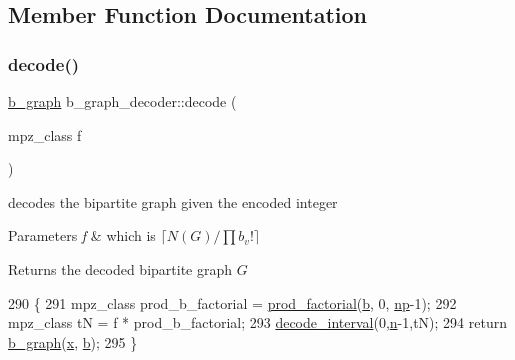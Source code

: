 \subsection{Member Function Documentation}
\mbox{\label{classb__graph__decoder_a81cffad95fa5a051fa4421b164f236a9}} 
\subsubsection{\texorpdfstring{decode()}{decode()}}
{\footnotesize\ttfamily \hyperlink{classb__graph}{b\+\_\+graph} b\+\_\+graph\+\_\+decoder\+::decode (\begin{DoxyParamCaption}\item[{mpz\+\_\+class}]{f }\end{DoxyParamCaption})}



decodes the bipartite graph given the encoded integer 


\begin{DoxyParams}{Parameters}
{\em f} & which is $\lceil N(G) / \prod b_v! \rceil$ \\
\hline
\end{DoxyParams}
\begin{DoxyReturn}{Returns}
the decoded bipartite graph $G$ 
\end{DoxyReturn}

\begin{DoxyCode}
290 \{
291   mpz\_class prod\_b\_factorial = \hyperlink{compression__helper_8cpp_a86d8a20e022dc06b23df3b08ac10b7d1}{prod\_factorial}(\hyperlink{classb__graph__decoder_a12d1a4a91f342111d2116196cb826317}{b}, 0, \hyperlink{classb__graph__decoder_a7eca48cf8793e722d1b29dbdc9fd2dca}{np}-1);
292   mpz\_class tN = f * prod\_b\_factorial;
293   \hyperlink{classb__graph__decoder_ae8b20698e015819cbdb8da7997888fd8}{decode\_interval}(0,\hyperlink{classb__graph__decoder_a2caddd63df6808c95e2ee738f7c77870}{n}-1,tN);
294   \textcolor{keywordflow}{return} \hyperlink{classb__graph}{b\_graph}(\hyperlink{classb__graph__decoder_a6bba2e67984f9733fc60c40dd4956587}{x}, \hyperlink{classb__graph__decoder_a12d1a4a91f342111d2116196cb826317}{b});
295 \}
\end{DoxyCode}
\mbox{\label{classb__graph__decoder_ae8b20698e015819cbdb8da7997888fd8}} 
